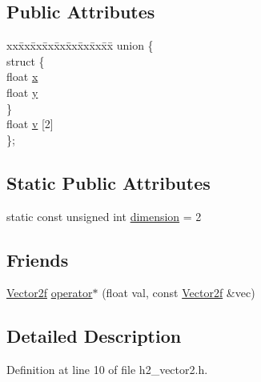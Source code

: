 \subsection*{Public Attributes}
\begin{DoxyCompactItemize}
\item 
\begin{tabbing}
xx\=xx\=xx\=xx\=xx\=xx\=xx\=xx\=xx\=\kill
union \{\\
\>struct \{\\
\>\>float \hyperlink{classh2_1_1_vector2f_a39a782153c3a3b1bcec9803a609a96fb}{x}\\
\>\>float \hyperlink{classh2_1_1_vector2f_ae38b4f697aa2273f1b5b4adf04ac949e}{y}\\
\>\} \\
\>float \hyperlink{classh2_1_1_vector2f_a0a3245e21b0f085c337587457de201de}{v} \mbox{[}2\mbox{]}\\
\}; \\

\end{tabbing}\end{DoxyCompactItemize}
\subsection*{Static Public Attributes}
\begin{DoxyCompactItemize}
\item 
static const unsigned int \hyperlink{classh2_1_1_vector2f_a085b562acedcfb84195a5ef60b742df8}{dimension} = 2
\end{DoxyCompactItemize}
\subsection*{Friends}
\begin{DoxyCompactItemize}
\item 
\hyperlink{classh2_1_1_vector2f}{Vector2f} \hyperlink{classh2_1_1_vector2f_a9049a4ebad6647c34f6598fb394974e8}{operator$\ast$} (float val, const \hyperlink{classh2_1_1_vector2f}{Vector2f} \&vec)
\end{DoxyCompactItemize}


\subsection{Detailed Description}


Definition at line 10 of file h2\-\_\-vector2.\-h.



